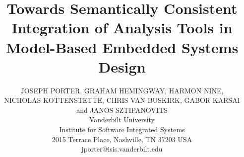 \title{Towards Semantically Consistent Integration of Analysis Tools in Model-Based Embedded Systems Design}
\author{JOSEPH PORTER, GRAHAM HEMINGWAY, HARMON NINE, \\ NICHOLAS KOTTENSTETTE, CHRIS VAN BUSKIRK, 
GABOR KARSAI \\ and JANOS SZTIPANOVITS \\
Vanderbilt University \\ Institute for Software Integrated Systems \\ 2015 Terrace Place, Nashville, TN 37203 USA\\ 
jporter@isis.vanderbilt.edu \\
}

